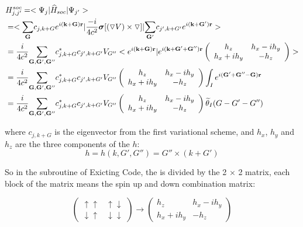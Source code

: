 \documentclass[a4paper]{report}
\begin{document}
\begin{equation}\label{soc}
\begin{split}
& H_{j,j'}^{soc} = < \Psi_j | \widehat{H}_{soc}  | \Psi_{j'} >  \\
& =   < \sumg<G> c_{j,k+G} \expg<(k+G)>  |  \frac{-i}{4 c^2} \boldsymbol{\sigma} [ (\triangledown V) \times \triangledown] |  \sumg<G'> c_{j',k+G'} \expg<(k+G')> > \\
& = \frac{i}{4c^2}\sumg<G,G',G''> c_{j,k+G}^{*} c_{j',k+G'} V_{G''} < \expg<(k+G)> | \expg<(k+G'+G'')>   \left( \begin{array}{cc}
h_z & h_x-i h_y\\
h_x+i h_y & -h_z\end{array} \right) > \\
& =  \frac{i}{4c^2}\sumg<G,G',G''> c_{j,k+G}^{*} c_{j',k+G'} V_{G''}  \left( \begin{array}{cc}
h_z & h_x-i h_y\\
h_x+i h_y & -h_z\end{array} \right)  \int_{I} \expg<(G'+G''-G)>   \\
& = \frac{i}{4c^2}\sumg<G,G',G''> c_{j,k+G}^{*} c_{j',k+G'} V_{G''}  \left( \begin{array}{cc}
h_z & h_x-i h_y\\
h_x+i h_y & -h_z\end{array} \right)  \widetilde{\theta}_{I}(G-G'-G'')  
\end{split}
\end{equation}

\noindent where $ c_{j,k+G}$ is the eigenvector from the first variational scheme, and $h_x$, $h_y$ and $h_z$ are the three components of the $h$:
\begin{equation}
 h=h(k,G',G'')= G'' \times (k+G')
\end{equation}

\noindent So in the subroutine of Exicting Code, the \hm is divided by the 2 $\times$ 2 matrix,
 each block of the matrix means the spin up and down combination matrix:

\begin{equation}\label{block}
 \left( \begin{array}{cc}
\uparrow \uparrow & \uparrow \downarrow\\
\downarrow \uparrow & \downarrow \downarrow \end{array} \right)
\rightarrow \left( \begin{array}{ccc}
h_z & h_x-ih_y\\
h_x+ih_y & -h_z\end{array} \right)
\end{equation}
\end{document}
